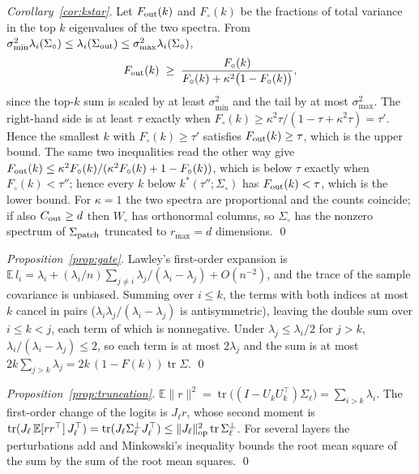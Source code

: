 \documentclass[10pt,journal,compsoc]{IEEEtran}
\begin{document}
\emph{Corollary~\ref{cor:kstar}.} Let $F_{\rm out}(k)$ and $F_{\circ}(k)$
be the fractions of total variance in the top $k$ eigenvalues of the two
spectra. From $\sigma_{\min}^2 \lambda_i(\Sigma_{\circ}) \le
\lambda_i(\Sigma_{\rm out}) \le \sigma_{\max}^2 \lambda_i(\Sigma_{\circ})$,
\[
  F_{\rm out}(k) \;\ge\; \frac{F_{\circ}(k)}{F_{\circ}(k) + \kappa^2 \bigl(1 - F_{\circ}(k)\bigr)},
\]
since the top-$k$ sum is scaled by at least $\sigma_{\min}^2$ and the tail by at most $\sigma_{\max}^2$. The right-hand side is at least $\tau$ exactly when
$F_{\circ}(k) \ge \kappa^2 \tau / (1 - \tau + \kappa^2 \tau) = \tau'$. Hence
the smallest $k$ with $F_{\circ}(k) \ge \tau'$ satisfies
$F_{\rm out}(k) \ge \tau$, which is the upper bound. The same two inequalities read the other way give $F_{\rm out}(k) \le \kappa^2 F_{\circ}(k) / (\kappa^2 F_{\circ}(k) + 1 - F_{\circ}(k))$, which is below $\tau$ exactly when $F_{\circ}(k) < \tau''$; hence every $k$ below $k^*(\tau''; \Sigma_{\circ})$ has $F_{\rm out}(k) < \tau$, which is the lower bound. For $\kappa = 1$ the
two spectra are proportional and the counts coincide; if also
$C_{\rm out} \ge d$ then $W_{\circ}$ has orthonormal columns, so
$\Sigma_{\circ}$ has the nonzero spectrum of $\Sigma_{\rm patch}$ truncated to
$r_{\max} = d$ dimensions. \qed

\emph{Proposition~\ref{prop:gate}.} Lawley's first-order expansion is $\mathbb{E}\,l_i = \lambda_i + (\lambda_i/n)\sum_{j \ne i} \lambda_j/(\lambda_i - \lambda_j) + O(n^{-2})$, and the trace of the sample covariance is unbiased. Summing over $i \le k$, the terms with both indices at most $k$ cancel in pairs ($\lambda_i\lambda_j/(\lambda_i - \lambda_j)$ is antisymmetric), leaving the double sum over $i \le k < j$, each term of which is nonnegative. Under $\lambda_j \le \lambda_i/2$ for $j > k$, $\lambda_i/(\lambda_i - \lambda_j) \le 2$, so each term is at most $2\lambda_j$ and the sum is at most $2k \sum_{j > k}\lambda_j = 2k\,(1 - F(k))\operatorname{tr}\Sigma$. \qed

\emph{Proposition~\ref{prop:truncation}.} $\mathbb{E}\|r\|^2 = \operatorname{tr}\bigl((I - U_kU_k^{\top})\Sigma_\ell\bigr) = \sum_{i > k}\lambda_i$. The first-order change of the logits is $J_\ell r$, whose second moment is $\operatorname{tr}(J_\ell\,\mathbb{E}[rr^{\top}]\,J_\ell^{\top}) = \operatorname{tr}(J_\ell \Sigma_\ell^{\perp} J_\ell^{\top}) \le \|J_\ell\|_{\rm op}^2 \operatorname{tr}\Sigma_\ell^{\perp}$. For several layers the perturbations add and Minkowski's inequality bounds the root mean square of the sum by the sum of the root mean squares. \qed
\end{document}
